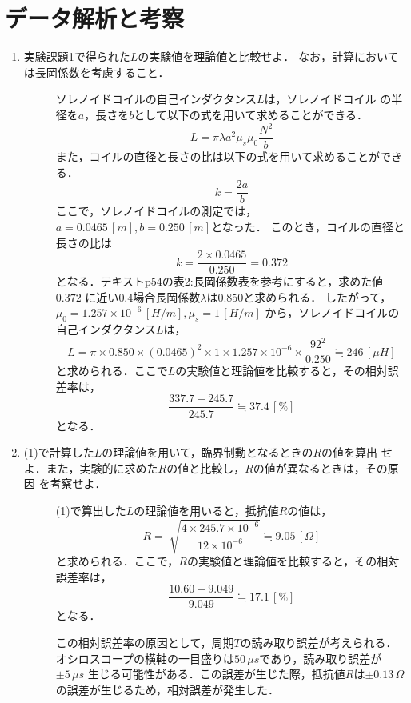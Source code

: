 
\section{データ解析と考察}
\begin{enumerate}
    \item 実験課題1で得られた$L$の実験値を理論値と比較せよ．
    なお，計算においては長岡係数を考慮すること．
    \begin{description}
        \item[] ソレノイドコイルの自己インダクタンス$L$は，ソレノイドコイル
        の半径を$a$，長さを$b$として以下の式を用いて求めることができる．
        $$
        L=\pi \lambda a^2 \mu_s \mu_0 \frac{N^2}{b}
        $$
        また，コイルの直径と長さの比は以下の式を用いて求めることができる．
        $$
        k=\frac{2a}{b}
        $$
        ここで，ソレノイドコイルの測定では，$a = 0.0465\,[\si{m}], b = 0.250\,[\si{m}]$となった．
        このとき，コイルの直径と長さの比は
        $$
        k=\frac{2\times0.0465}{0.250}=0.372
        $$
        となる．テキストp54の表2:長岡係数表を参考にすると，求めた値$0.372$
        に近い$0.4$場合長岡係数$\lambda$は$0.850$と求められる．
        したがって，$\mu_0 = 1.257 \times 10^{-6}\,[\si{H/m}] , \mu_s = 1\,[\si{H/m}]$
        から，ソレノイドコイルの自己インダクタンス$L$は，
        $$
        L=\pi \times 0.850 \times (0.0465)^2 \times 1 \times 1.257 \times 10^{-6} \times \frac{92^2}{0.250} \fallingdotseq 246\,[\si{\mu H}]
        $$
        と求められる．ここで$L$の実験値と理論値を比較すると，その相対誤差率は，
        $$
        \frac{337.7-245.7}{245.7} \fallingdotseq 37.4\,[\%]
        $$
        となる．
    \end{description}

    \item (1)で計算した$L$の理論値を用いて，臨界制動となるときの$R$の値を算出
    せよ．また，実験的に求めた$R$の値と比較し，$R$の値が異なるときは，その原因
    を考察せよ．
    \begin{description}
        \item[] (1)で算出した$L$の理論値を用いると，抵抗値$R$の値は，
        $$
        R=\sqrt[]{\frac{4 \times 245.7 \times 10^{-6}}{12 \times 10^{-6}}} \fallingdotseq 9.05\,[\Omega]
        $$
        と求められる．ここで，$R$の実験値と理論値を比較すると，その相対誤差率は，
        $$
        \frac{10.60-9.049}{9.049} \fallingdotseq 17.1\,[\%]
        $$
        となる．

        この相対誤差率の原因として，周期$T$の読み取り誤差が考えられる．
        オシロスコープの横軸の一目盛りは$50\,\si{\mu s}$であり，読み取り誤差が$\pm 5\,\si{\mu s}$
        生じる可能性がある．この誤差が生じた際，抵抗値$R$は$\pm 0.13\,\si{\Omega}$
        の誤差が生じるため，相対誤差が発生した．
    \end{description}
\end{enumerate}